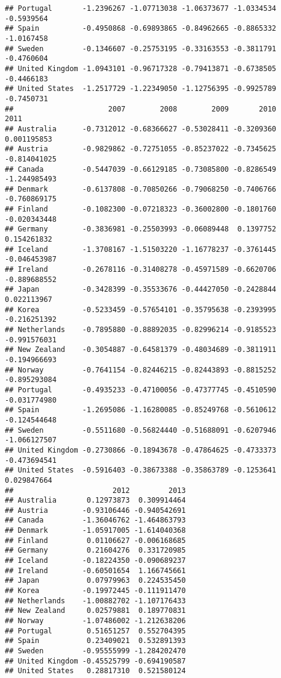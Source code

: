 \documentclass[
]{article}
\begin{document}
\begin{verbatim}
## Portugal       -1.2396267 -1.07713038 -1.06373677 -1.0334534 -0.5939564
## Spain          -0.4950868 -0.69893865 -0.84962665 -0.8865332 -1.0167458
## Sweden         -0.1346607 -0.25753195 -0.33163553 -0.3811791 -0.4760604
## United Kingdom -1.0943101 -0.96717328 -0.79413871 -0.6738505 -0.4466183
## United States  -1.2517729 -1.22349050 -1.12756395 -0.9925789 -0.7450731
##                      2007        2008        2009       2010         2011
## Australia      -0.7312012 -0.68366627 -0.53028411 -0.3209360  0.001195853
## Austria        -0.9829862 -0.72751055 -0.85237022 -0.7345625 -0.814041025
## Canada         -0.5447039 -0.66129185 -0.73085800 -0.8286549 -1.244985493
## Denmark        -0.6137808 -0.70850266 -0.79068250 -0.7406766 -0.760869175
## Finland        -0.1082300 -0.07218323 -0.36002800 -0.1801760 -0.020343448
## Germany        -0.3836981 -0.25503993 -0.06089448  0.1397752  0.154261832
## Iceland        -1.3708167 -1.51503220 -1.16778237 -0.3761445 -0.046453987
## Ireland        -0.2678116 -0.31408278 -0.45971589 -0.6620706 -0.889688552
## Japan          -0.3428399 -0.35533676 -0.44427050 -0.2428844  0.022113967
## Korea          -0.5233459 -0.57654101 -0.35795638 -0.2393995 -0.216251392
## Netherlands    -0.7895880 -0.88892035 -0.82996214 -0.9185523 -0.991576031
## New Zealand    -0.3054887 -0.64581379 -0.48034689 -0.3811911 -0.194966693
## Norway         -0.7641154 -0.82446215 -0.82443893 -0.8815252 -0.895293084
## Portugal       -0.4935233 -0.47100056 -0.47377745 -0.4510590 -0.031774980
## Spain          -1.2695086 -1.16280085 -0.85249768 -0.5610612 -0.124544648
## Sweden         -0.5511680 -0.56824440 -0.51688091 -0.6207946 -1.066127507
## United Kingdom -0.2730866 -0.18943678 -0.47864625 -0.4733373 -0.473694541
## United States  -0.5916403 -0.38673388 -0.35863789 -0.1253641  0.029847664
##                       2012         2013
## Australia       0.12973873  0.309914464
## Austria        -0.93106446 -0.940542691
## Canada         -1.36046762 -1.464863793
## Denmark        -1.05917005 -1.614040368
## Finland         0.01106627 -0.006168685
## Germany         0.21604276  0.331720985
## Iceland        -0.18224350 -0.090689237
## Ireland        -0.60501654  1.166745661
## Japan           0.07979963  0.224535450
## Korea          -0.19972445 -0.111911470
## Netherlands    -1.00882702 -1.107176433
## New Zealand     0.02579881  0.189770831
## Norway         -1.07486002 -1.212638206
## Portugal        0.51651257  0.552704395
## Spain           0.23409021  0.532891393
## Sweden         -0.95555999 -1.284202470
## United Kingdom -0.45525799 -0.694190587
## United States   0.28817310  0.521580124
\end{verbatim}
\end{document}
